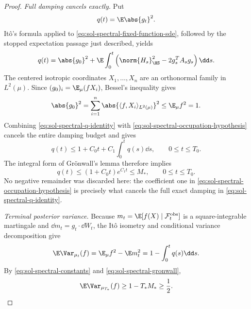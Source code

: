 \documentclass[../main.tex]{subfiles}
\begin{document}
\begin{proof}
\medskip
\noindent\emph{Full damping cancels exactly.}
Put
\[
  q(t)=\E\abs{g_t}^2.
\]
It\^o's formula applied to \eqref{eq:sol-spectral-fixed-function-sde}, followed by the stopped
expectation passage just described, yields
\begin{equation}
  q(t)=\abs{g_0}^2+
  \E\int_0^t\left(\norm{H_s}_{\HS}^2-2g_s^TA_sg_s\right)\dd s.
  \label{eq:sol-spectral-q-identity}
\end{equation}
The centered isotropic coordinates $X_1,\ldots,X_n$ are an orthonormal family in
$L^2(\mu)$.  Since $(g_0)_i=\E_\mu(fX_i)$, Bessel's inequality gives
\begin{equation}
  \abs{g_0}^2=\sum_{i=1}^n\abs{\langle f,X_i\rangle_{L^2(\mu)}}^2
  \le\E_\mu f^2=1.
  \label{eq:sol-spectral-initial-bessel}
\end{equation}
Combining \eqref{eq:sol-spectral-q-identity} with
\eqref{eq:sol-spectral-occupation-hypothesis} cancels the entire damping budget and gives
\begin{equation}
  q(t)\le1+C_0t+C_1\int_0^tq(s)\dd s,
  \qquad 0\le t\le T_0.
  \label{eq:sol-spectral-gronwall-input}
\end{equation}
The integral form of Gr\"onwall's lemma therefore implies
\begin{equation}
  q(t)\le(1+C_0t)e^{C_1t}\le M_*,
  \qquad 0\le t\le T_0.
  \label{eq:sol-spectral-gronwall}
\end{equation}
No negative remainder was discarded here: the coefficient one in
\eqref{eq:sol-spectral-occupation-hypothesis} is precisely what cancels the full exact damping
in \eqref{eq:sol-spectral-q-identity}.

\medskip
\noindent\emph{Terminal posterior variance.}
Because $m_t=\E[f(X)\mid\mathcal F_t^{\mathrm{obs}}]$ is a square-integrable martingale and
$\dd m_t=g_t\cdot\dd W_t$, the It\^o isometry and conditional variance decomposition give
\begin{equation}
  \E\Var_{\mu_t}(f)
  =\E_\mu f^2-\E m_t^2
  =1-\int_0^tq(s)\dd s.
  \label{eq:sol-spectral-total-variance}
\end{equation}
By \eqref{eq:sol-spectral-constants} and \eqref{eq:sol-spectral-gronwall},
\begin{equation}
  \E\Var_{\mu_{T_*}}(f)\ge1-T_*M_*\ge\frac12.
  \label{eq:sol-spectral-terminal-lower}
\end{equation}


\end{proof}
\end{document}
